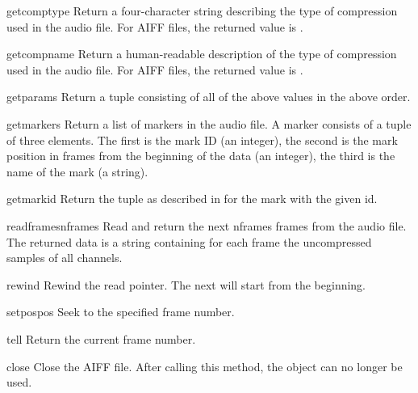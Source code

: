 \begin{funcdesc}{getcomptype}{}
Return a four-character string describing the type of compression used
in the audio file.  For AIFF files, the returned value is
.
\end{funcdesc}

\begin{funcdesc}{getcompname}{}
Return a human-readable description of the type of compression used in
the audio file.  For AIFF files, the returned value is .
\end{funcdesc}

\begin{funcdesc}{getparams}{}
Return a tuple consisting of all of the above values in the above
order.
\end{funcdesc}

\begin{funcdesc}{getmarkers}{}
Return a list of markers in the audio file.  A marker consists of a
tuple of three elements.  The first is the mark ID (an integer), the
second is the mark position in frames from the beginning of the data
(an integer), the third is the name of the mark (a string).
\end{funcdesc}

\begin{funcdesc}{getmark}{id}
Return the tuple as described in  for the mark with
the given id.
\end{funcdesc}

\begin{funcdesc}{readframes}{nframes}
Read and return the next nframes frames from the audio file.  The
returned data is a string containing for each frame the uncompressed
samples of all channels.
\end{funcdesc}

\begin{funcdesc}{rewind}{}
Rewind the read pointer.  The next  will start from
the beginning.
\end{funcdesc}

\begin{funcdesc}{setpos}{pos}
Seek to the specified frame number.
\end{funcdesc}

\begin{funcdesc}{tell}{}
Return the current frame number.
\end{funcdesc}

\begin{funcdesc}{close}{}
Close the AIFF file.  After calling this method, the object can no
longer be used.
\end{funcdesc}

